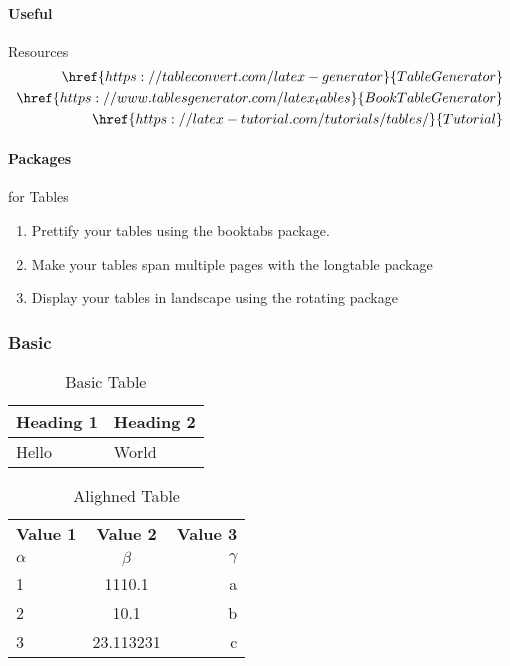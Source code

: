 \documentclass{report}[a4paper,12pt] %
\begin{document}
\paragraph{Useful} Resources
\begin{align*}
  \href{https://tableconvert.com/latex-generator}{Table Generator}\\
  \href{https://www.tablesgenerator.com/latex_tables}{Book Table Generator}\\
  \href{https://latex-tutorial.com/tutorials/tables/}{Tutorial}
\end{align*}

\paragraph*{Packages} for Tables
\begin{enumerate}
  \item Prettify your tables using the booktabs package.
  \item Make your tables span multiple pages with the longtable package
  \item Display your tables in landscape using the rotating package  
\end{enumerate}

\subsubsection{Basic}
\begin{table}[!h]
  \centering
  \caption{Basic Table}
  \begin{tabular}{|l|l|}
  \hline
      \textbf{Heading 1} & \textbf{Heading 2} \\ \hline
      Hello & World \\ \hline
  \end{tabular}
  \label{tab:basic}
\end{table}

\begin{table}[h!]
  \begin{center}
    \caption{Alighned Table}
    \label{tab:alighned}
    \begin{tabular}{l|c|r} %
      \textbf{Value 1} & \textbf{Value 2} & \textbf{Value 3}\\
      $\alpha$ & $\beta$ & $\gamma$ \\
      \hline
      1 & 1110.1 & a\\
      2 & 10.1 & b\\
      3 & 23.113231 & c\\
    \end{tabular}
  \end{center}
\end{table}
\end{document}
